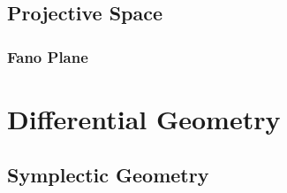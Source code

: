 \subsection{Projective Space}\label{sec:projective_space}

\subsubsection{Fano Plane}\label{sec:fano_plane}



\section{Differential Geometry}\label{sec:differential_geometry}

\subsection{Symplectic Geometry}\label{sec:symplectic_geometry}
